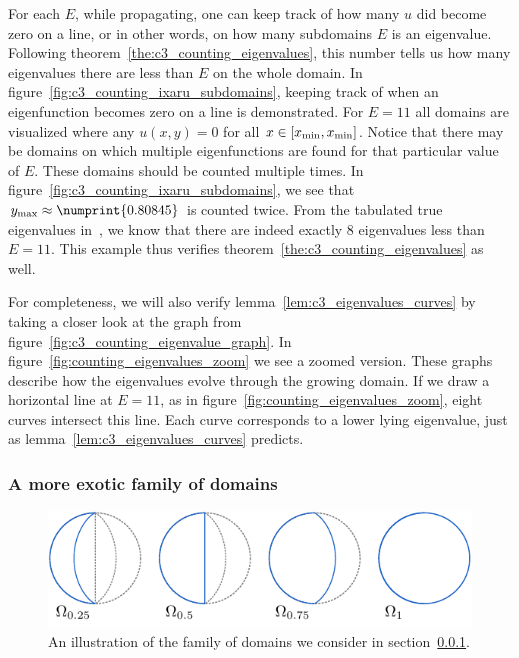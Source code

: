 For each $E$, while propagating, one can keep track of how many $u$ did become zero on a line, or in other words, on how many subdomains $E$ is an eigenvalue. Following theorem~\ref{the:c3_counting_eigenvalues}, this number tells us how many eigenvalues there are less than $E$ on the whole domain. In figure~\ref{fig:c3_counting_ixaru_subdomains}, keeping track of when an eigenfunction becomes zero on a line is demonstrated. For $E = 11$ all domains are visualized where any $u(x, y) = 0$ for all $x \in [{x_{\text{min}}}, {x_{\text{min}}}]$. Notice that there may be domains on which multiple eigenfunctions are found for that particular value of $E$. These domains should be counted multiple times. In figure~\ref{fig:c3_counting_ixaru_subdomains}, we see that $\ymax \approx \numprint{0.80845}$ is counted twice. From the tabulated true eigenvalues in~\cite{ixaru_new_2010}, we know that there are indeed exactly $8$ eigenvalues less than $E = 11$. This example thus verifies theorem~\ref{the:c3_counting_eigenvalues} as well.

For completeness, we will also verify lemma~\ref{lem:c3_eigenvalues_curves} by taking a closer look at the graph from figure~\ref{fig:c3_counting_eigenvalue_graph}. In figure~\ref{fig:counting_eigenvalues_zoom} we see a zoomed version. These graphs describe how the eigenvalues evolve through the growing domain. If we draw a horizontal line at $E = 11$, as in figure~\ref{fig:counting_eigenvalues_zoom}, eight curves intersect this line. Each curve corresponds to a lower lying eigenvalue, just as lemma~\ref{lem:c3_eigenvalues_curves} predicts.


\subsubsection{A more exotic family of domains}\label{sec:c3_counting_exotic_domain}

\begin{figure}
  \begin{center}
    \includegraphics[width=\linewidth]{img/chapter3/counting/moons.pdf}
    \caption{An illustration of the family of domains we consider in section~\ref{sec:c3_counting_exotic_domain}.}\label{fig:c3_counting_visual_moons}
  \end{center}
\end{figure}

